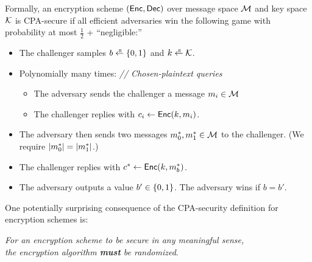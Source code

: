 \begin{definition}\label{defn:cpa}
Formally, an encryption scheme $(\mathsf{Enc}, \mathsf{Dec})$ over message space $\mathcal{M}$
and key space $\mathcal{K}$ is CPA-secure if 
all efficient adversaries win
the following game with probability at most $\tfrac{1}{2}$ + ``negligible:''
  \begin{itemize}[noitemsep]
		\item The challenger samples $b \rgets \bin$ and $k \rgets \calK$.
    \item Polynomially many times: \quad \emph{// Chosen-plaintext queries}
          \begin{itemize}
            \item The adversary sends the challenger a message $m_i \in \mathcal{M}$
            \item The challenger replies with $c_i \gets \mathsf{Enc}(k, m_i)$.
          \end{itemize}
    \item The adversary then sends two messages $m^*_0, m^*_1 \in \mathcal{M}$ to the challenger.
          (We require $\left| m^*_0 \right| = \left| m^*_1 \right|$.)

    \item The challenger replies with $c^* \gets \mathsf{Enc}(k, m^*_b)$.
		\item The adversary outputs a value $b' \in \{0,1\}$. The adversary wins if $b=b'$. 
	\end{itemize}
\end{definition}

One potentially surprising consequence of the CPA-security definition 
for encryption schemes is:
\begin{center}
\emph{For an encryption scheme to be secure in any meaningful sense,\\
the encryption algorithm \textbf{must} be randomized}.
\end{center}

